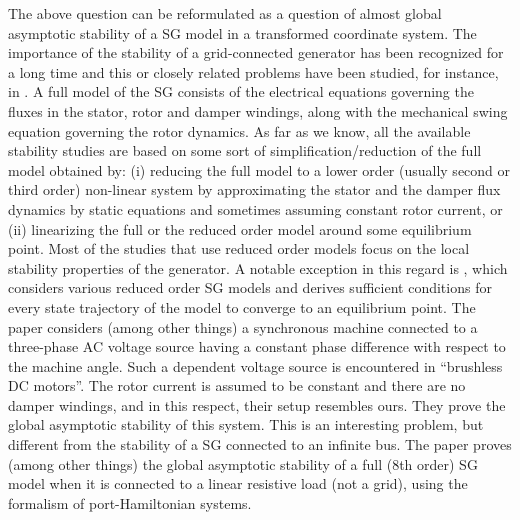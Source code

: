 \documentclass[12pt]{article}
\theoremstyle{definition}
\numberwithin{equation}{section}                        %
\begin{document}
The above question can be reformulated as a question of almost global
asymptotic stability of a SG model in a transformed coordinate system.
The importance of the stability of a grid-connected generator has been
recognized for a long time and this or closely related problems have
been studied, for instance, in \cite{DeCo:1969,GOBS:03,GrSt:94,Kun:94,
Park:1929,SaPa:97,YuWo:1967,ZhOh:09}. A full model of the SG consists
of the electrical equations governing the fluxes in the stator, rotor
and damper windings, along with the mechanical swing equation
governing the rotor dynamics. As far as we know, all the available
stability studies are based on some sort of simplification/reduction
of the full model obtained by: (i) reducing the full model to a lower
order (usually second or third order) non-linear system by
approximating the stator and the damper flux dynamics by static
equations and sometimes assuming constant rotor current, or (ii)
linearizing the full or the reduced order model around some
equilibrium point. Most of the studies that use reduced order models
focus on the local stability properties of the generator. A notable
exception in this regard is \cite{HaLeRa:87}, which considers various
reduced order SG models and derives sufficient conditions for every
state trajectory of the model to converge to an equilibrium point. The
paper \cite{CaTa:14} considers (among other things) a synchronous
machine connected to a three-phase AC voltage source having a constant
phase difference with respect to the machine angle. Such a dependent
voltage source is encountered in ``brushless DC motors''. The rotor
current is assumed to be constant and there are no damper windings,
and in this respect, their setup resembles ours. They prove the global
asymptotic stability of this system. This is an interesting problem,
but different from the stability of a SG connected to an infinite
bus. The paper \cite{FZOSS} proves (among other things) the global
asymptotic stability of a full (8th order) SG model when it is
connected to a linear resistive load (not a grid), using the formalism
of port-Hamiltonian systems.
\end{document}
